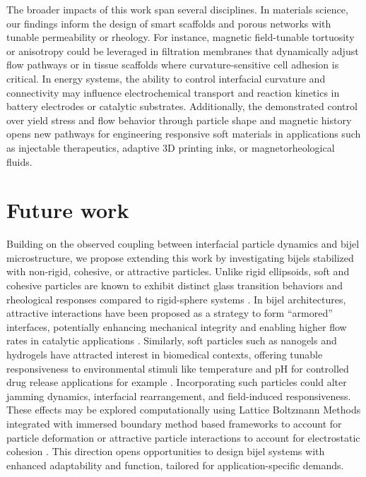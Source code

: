 The broader impacts of this work span several disciplines. In materials science, our findings inform the design of smart scaffolds and porous 
networks with tunable permeability or rheology. For instance, magnetic field-tunable tortuosity or anisotropy could be leveraged in filtration 
membranes that dynamically adjust flow pathways or in tissue scaffolds where curvature-sensitive cell adhesion is critical. In energy systems, 
the ability to control interfacial curvature and connectivity may influence electrochemical transport and reaction kinetics in battery electrodes 
or catalytic substrates. Additionally, the demonstrated control over yield stress and flow behavior through particle shape and magnetic history 
opens new pathways for engineering responsive soft materials in applications such as injectable therapeutics, adaptive 3D printing inks, or 
magnetorheological fluids.

\section{Future work}

Building on the observed coupling between interfacial particle dynamics and bijel microstructure, we propose extending 
this work by investigating bijels stabilized with non-rigid, cohesive, or attractive particles. Unlike rigid ellipsoids, 
soft and cohesive particles are known to exhibit distinct glass transition behaviors and rheological responses compared 
to rigid-sphere systems \cite{weeks_introduction_2017, torquato_jammed_2010}. In bijel architectures, attractive interactions have been 
proposed as a strategy to form “armored” interfaces, potentially enhancing mechanical integrity and enabling higher flow rates in catalytic 
applications \cite{boakye-ansah_controlling_2020}. 
Similarly, soft particles such as nanogels and hydrogels have attracted interest in biomedical contexts, offering tunable responsiveness 
to environmental stimuli like temperature and pH for controlled drug release applications for example \cite{thorson_bijel-templated_2019, vanoli_bijels_2022}. 
Incorporating such particles 
could alter jamming dynamics, interfacial rearrangement, and field-induced responsiveness. These effects may be 
explored computationally using Lattice Boltzmann Methods integrated with immersed boundary method based frameworks to account for
particle deformation or attractive particle interactions to account for electrostatic cohesion \cite{silva_lattice_2024}. This direction opens opportunities 
to design bijel systems with enhanced adaptability and function, tailored for application-specific demands.

